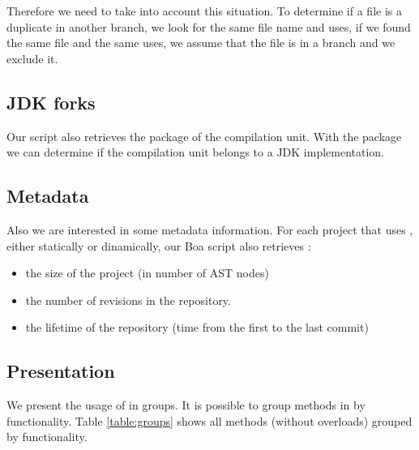 Therefore we need to take into account this situation.
To determine if a file is a duplicate in another branch, we look for the same file name and uses, if we found the same file and the same uses, we assume that the file is in a branch and we exclude it.

\subsection{JDK forks}

Our script also retrieves the package of the compilation unit.
With the package we can determine if the compilation unit belongs to a JDK implementation.

\subsection{Metadata}

Also we are interested in some metadata information.
For each project that uses \smu{}, either statically or dinamically, our Boa script also retrieves :
\begin{itemize}
\item the size of the project (in number of AST nodes)
\item the number of revisions in the repository.
\item the lifetime of the repository (time from the first to the last commit)
\end{itemize}

\subsection{Presentation}

We present the usage of \smu{} in groups.
It is possible to group methods in \smu{} by functionality.
Table \ref{table:groups} shows all methods (without overloads) grouped by functionality.


